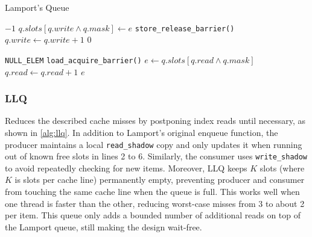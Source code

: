 \begin{algorithm}[!ht]
    \centering
    \captionsetup{justification=centering}
    \caption{Lamport's Queue \cite{MaffioneCacheAware}}
    \label{alg:lamport-queue}
    \scriptsize
    \begin{algorithmic}[1]
             
                \State \Return $-1$ 
            \EndIf
            \State $q.slots[q.write \land q.mask] \gets e$
            \State \texttt{store\_release\_barrier()}
            \State $q.write \gets q.write + 1$
            \State \Return $0$
        \EndFunction
        
        \State
        
             
                \State \Return \texttt{NULL\_ELEM} 
            \EndIf
            \State \texttt{load\_acquire\_barrier()}
            \State $e \gets q.slots[q.read \land q.mask]$
            \State $q.read \gets q.read + 1$
            \State \Return $e$
        \EndFunction
    \end{algorithmic}
    \cite{MaffioneCacheAware}
\end{algorithm}

\subsubsection{\acf{LLQ}}
Reduces the described cache misses by postponing index reads until necessary, as shown in \cref{alg:llq}. In addition to Lamport's original enqueue function, the producer maintains a local \texttt{read\_shadow} copy and only updates it when running out of known free slots in lines 2 to 6. Similarly, the consumer uses \texttt{write\_shadow} to avoid repeatedly checking for new items. Moreover, \ac{LLQ} keeps $K$ slots (where $K$ is slots per cache line) permanently empty, preventing producer and consumer from touching the same cache line when the queue is full. This works well when one thread is faster than the other, reducing worst-case misses from 3 to about 2 per item. This queue only adds a bounded number of additional reads on top of the Lamport queue, still making the design wait-free. \cite{MaffioneCacheAware}


